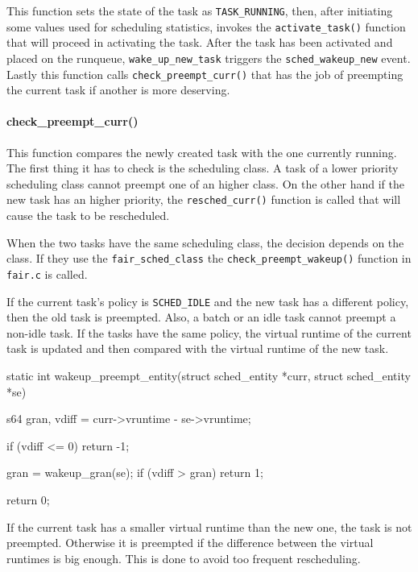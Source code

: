 \documentclass[10pt]{book}
\begin{document}
This function sets the state of the task as \verb|TASK_RUNNING|, then, after initiating some values used for scheduling statistics, invokes the \verb|activate_task()| function that will proceed in activating the task. After the task has been activated and placed on the runqueue, \verb|wake_up_new_task| triggers the \verb|sched_wakeup_new| \label{trace:sched_wakeup_new} event. Lastly this function calls \verb|check_preempt_curr()| that has the job of preempting the current task if another is more deserving. 

\paragraph{check\_preempt\_curr()}\label{check_preempt_curr}
This function compares the newly created task with the one currently running. The first thing it has to check is the scheduling class. A task of a lower priority scheduling class cannot preempt one of an higher class. On the other hand if the new task has an higher priority, the \verb|resched_curr()| function is called that will cause the task to be rescheduled.

When the two tasks have the same scheduling class, the decision depends on the class. If they use the \verb|fair_sched_class| the \newline \verb|check_preempt_wakeup()| function in \verb|fair.c| is called.

If the current task's policy is \verb|SCHED_IDLE| and the new task has a different policy, then the old task is preempted. Also, a batch or an idle task cannot preempt a non-idle task. If the tasks have the same policy, the virtual runtime of the current task is updated and then compared with the virtual runtime of the new task.

\begin{code}
static int
wakeup_preempt_entity(struct sched_entity *curr, struct sched_entity *se)
{
	s64 gran, vdiff = curr->vruntime - se->vruntime;

	if (vdiff <= 0)
		return -1;

	gran = wakeup_gran(se);
	if (vdiff > gran)
		return 1;

	return 0;
}
\end{code}

If the current task has a smaller virtual runtime than the new one, the task is not preempted. Otherwise it is preempted if the difference between the virtual runtimes is big enough. This is done to avoid too frequent rescheduling. 
\end{document}
